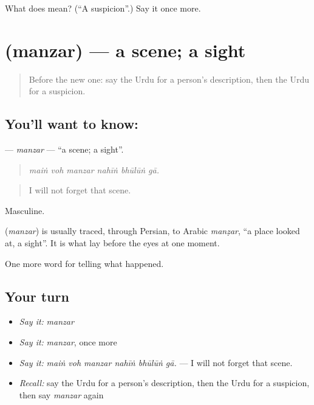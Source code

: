 \begin{tcolorbox}[breakable,colback=teal!4,colframe=teal!35!black,title={Before you move on}]
What does  mean? (\textquotedblleft{}A suspicion\textquotedblright{}.) Say it once more.
\end{tcolorbox}
\section[\texorpdfstring{\ur{منظر} (manzar)}{منظر (manzar)}]{ (manzar) — a scene; a sight}

\label{lesson:UR-C279-manzar}



\begin{quote}
Before the new one: say the Urdu for a person's description, then the Urdu for a suspicion.
\end{quote}

\subsection*{You'll want to know: }
\textbf{} — \emph{manzar} — \textquotedblleft{}a scene; a sight\textquotedblright{}.

\begin{quote}
     
\end{quote}

\begin{quote}
\emph{maiṅ voh manzar nahīṅ bhūlūṅ gā.}
\end{quote}

\begin{quote}
I will not forget that scene.
\end{quote}

Masculine.

\begin{cousinweb}
\textbf{} (\emph{manzar}) is usually traced, through Persian, to Arabic \emph{manẓar}, \textquotedblleft{}a place looked at, a sight\textquotedblright{}. It is what lay before the eyes at one moment.
\end{cousinweb}

\begin{grammarlens}[title={What you've built}]
One more word for telling what happened.
\end{grammarlens}

\subsection*{Your turn}
\begin{itemize}
\raggedright
  \item \emph{Say it:} \emph{manzar}
  \item \emph{Say it:} \emph{manzar}, once more
  \item \emph{Say it:} \emph{maiṅ voh manzar nahīṅ bhūlūṅ gā.} — I will not forget that scene.
  \item \emph{Recall:} say the Urdu for a person's description, then the Urdu for a suspicion, then say \emph{manzar} again
\end{itemize}

